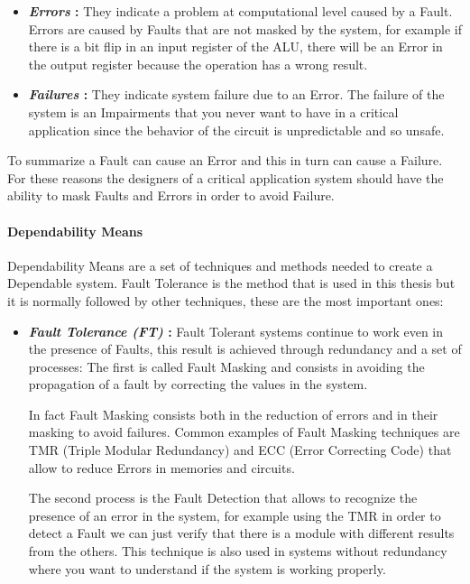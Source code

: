 {{{{\begin{itemize}
					\item \textbf{\textit{Errors} : } They indicate a problem at computational level caused by a Fault. Errors are caused by Faults that are not masked by the system, for example if there is a  bit flip in an input register of the ALU, there will be an Error in the output register because the operation has a wrong result.
					
					\item \textbf{\textit{Failures} : }  They indicate system failure due to an Error. The failure of the system is an Impairments that you never want to have in a critical application since the behavior of the circuit is unpredictable and so unsafe. 
				\end{itemize}	
				To summarize a Fault can cause an Error and this in turn can cause a Failure. For these reasons the designers of a critical application system should have the ability to mask Faults and Errors in order to avoid Failure.
			} %
			\paragraph*{Dependability Means}{
				Dependability Means are a set of techniques and methods needed to create a Dependable system. Fault Tolerance is the method that is used in this thesis but it is normally followed by other techniques, these are the most important ones:
				\begin{itemize}
					\item \textbf{\textit{Fault Tolerance (FT)} : } Fault Tolerant systems continue to work even in the presence of Faults, this result is achieved through redundancy and a set of processes: The first is called Fault Masking and consists in avoiding the propagation of a fault by correcting the values in the system.
					
					In fact Fault Masking consists both in the reduction of errors and in their masking to avoid failures. 
					Common examples of Fault Masking techniques are TMR (Triple Modular Redundancy) and ECC (Error Correcting Code) that allow to reduce Errors in memories and circuits. 
					
					The second process is the Fault Detection that allows to recognize the presence of an error in the system, for example using the TMR in order to detect a Fault we can just verify that there is a module with different results from the others.
					This technique is also used in systems without redundancy where you want to understand if the system is working properly.
					

\end{itemize}}}}}
